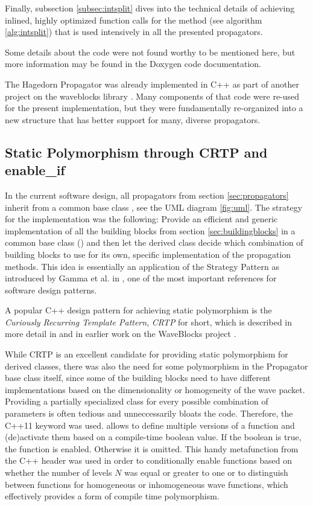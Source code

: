 Finally, subsection \ref{subsec:intsplit} dives into the technical details of achieving inlined, highly optimized function calls for the  method (see algorithm \ref{alg:intsplit}) that is used intensively in all the presented propagators.
\par\medskip
%
Some details about the code were not found worthy to be mentioned here,
but more information may be found in the Doxygen code documentation.
\par\medskip
%
The Hagedorn Propagator was already implemented in C++ as part of another project on the waveblocks library \cite{libwaveblocks}.
Many components of that code were re-used for the present implementation, but they were fundamentally re-organized into a new structure that has better support for many, diverse propagators.


\subsection{Static Polymorphism through CRTP and enable\_if}
\label{subsec:poly}
%
In the current software design, all propagators from section \ref{sec:propagators} inherit from a common base class , see the UML diagram \ref{fig:uml}.
The strategy for the implementation was the following:
Provide an efficient and generic implementation of all the building blocks from section \ref{sec:buildingblocks} in a common base class () and then let the derived class decide which combination of building blocks to use for its own, specific implementation of the propagation methods.
This idea is essentially an application of the Strategy Pattern as introduced by Gamma et al. in \cite{Gamma1995}, one of the most important references for software design patterns.
\par\medskip
%
A popular C++ design pattern for achieving static polymorphism is the \emph{Curiously Recurring Template Pattern}, \emph{CRTP} for short, which is described in more detail in \cite{C_CRTP} and in earlier work on the WaveBlocks project \cite{libwaveblocks}.
\par\medskip
%
While CRTP is an excellent candidate for providing static polymorphism for derived classes, there was also the need for some polymorphism in the Propagator base class itself, since some of the building blocks need to have different implementations based on the dimensionality or homogeneity of the wave packet. 
Providing a partially specialized class for every possible combination of parameters is often tedious and unneccessarily bloats the code.
Therefore, the C++11  keyword was used.
 allows to define multiple versions of a function and (de)activate them based on a compile-time boolean value.
If the boolean is true, the function is enabled. Otherwise it is omitted.
This handy metafunction from the C++  header was used in order to conditionally enable functions based on whether the number of levels $N$ was equal or greater to one or to distinguish between functions for homogeneous or inhomogeneous wave functions, which effectively provides a form of compile time polymorphism.


